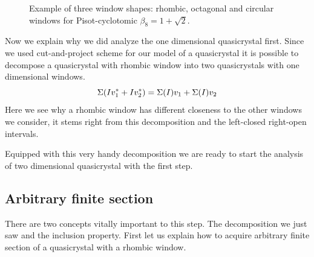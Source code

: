 \documentclass[text.tex]{subfiles}
\begin{document}
\begin{figure}[h!]
\centering
{}
\caption{Example of three window shapes: rhombic, octagonal and circular windows for Pisot-cyclotomic $\beta_8=1+\sqrt{2}$.}
\end{figure}

Now we explain why we did analyze the one dimensional quasicrystal first. Since we used cut-and-project scheme for our model of a quasicrystal it is possible to decompose a quasicrystal with rhombic window into two quasicrystals with one dimensional windows. 
$$\Sigma(Iv_1^\ast+Iv_2^\ast) = \Sigma(I)v_1+\Sigma(I)v_2$$
Here we see why a rhombic window has different closeness to the other windows we consider, it stems right from this decomposition and the left-closed right-open intervals.

Equipped with this very handy decomposition we are ready to start the analysis of two dimensional quasicrystal with the first step. 

\subsection{Arbitrary finite section}
There are two concepts vitally important to this step. The decomposition we just saw and the inclusion property. First let us explain how to acquire arbitrary finite section of a quasicrystal with a rhombic window. 
\end{document}

